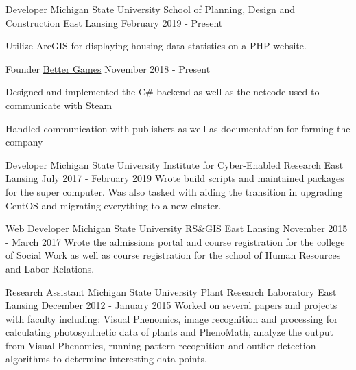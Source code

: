 
\begin{cventries}
  \cventry
  {Developer}
  {Michigan State University School of Planning, Design and Construction}
  {East Lansing}
  {February 2019 - Present}
  {
    \begin{cvitems}
      \item {Utilize ArcGIS for displaying housing data statistics on a PHP website.}
    \end{cvitems}
  }

  \cventry
    {Founder} %
    {\href{https://better-games.org}{Better Games}} %
    {} %
    {November 2018 - Present} %
    {
        \begin{cvitems}
          \item {Designed and implemented the C\# backend as well as the netcode used to communicate with Steam}
          \item {Handled communication with publishers as well as documentation for forming the company}
        \end{cvitems}
    }

  \cventry
    {Developer}
    {\href{https://icer.msu.edu}{Michigan State University Institute for Cyber-Enabled Research}}
    {East Lansing}
    {July 2017 - February 2019}
    {
        {Wrote build scripts and maintained packages for the super computer. Was also tasked with aiding the transition
        in upgrading CentOS and migrating everything to a new cluster.}
    }

  \cventry
    {Web Developer}
    {\href{http://www.rsgis.msu.edu}{Michigan State University RS\&GIS}}
    {East Lansing}
    {November 2015 - March 2017}
    {
      {Wrote the admissions portal and course registration for the college of Social Work as well as
      course registration for the school of Human Resources and Labor Relations.}
    }

  \cventry
    {Research Assistant}
    {\href{https://prl.natsci.msu.edu/research-tech/center-for-advanced-algal-and-plant-phenotyping}{Michigan State University Plant Research Laboratory}}
    {East Lansing}
    {December 2012 - January 2015}
    {
      {Worked on several papers and projects with faculty including: Visual Phenomics, image recognition
      and processing for calculating photosynthetic data of plants and PhenoMath, analyze the output from Visual Phenomics,
      running pattern recognition and outlier detection algorithms to determine interesting data-points. }
    }
\end{cventries}
